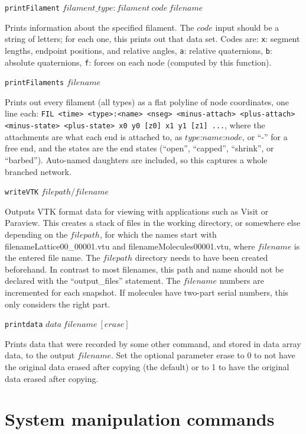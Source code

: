 \documentclass {scrbook}
\newcommand {\ttt} {\texttt}
\begin{document}
\begin{description}
\item{\ttt{printFilament} $filament\_type:filament\ code\ filename$}

Prints information about the specified filament. The $code$ input should be a string of letters; for each one, this prints out that data set. Codes are: \ttt{x}: segment lengths, endpoint positions, and relative angles, \ttt{a}: relative quaternions, \ttt{b}: absolute quaternions, \ttt{f}: forces on each node (computed by this function).

\item{\ttt{printFilaments} $filename$}

Prints out every filament (all types) as a flat polyline of node coordinates, one line each: \ttt{FIL <time> <type>:<name> <nseg> <minus-attach> <plus-attach> <minus-state> <plus-state> x0 y0 [z0] x1 y1 [z1] ...}, where the attachments are what each end is attached to, as $type$:$name$:$node$, or ``-'' for a free end, and the states are the end states (``open'', ``capped'', ``shrink'', or ``barbed''). Auto-named daughters are included, so this captures a whole branched network.

\item{\ttt{writeVTK} $filepath/filename$}

Outputs VTK format data for viewing with applications such as Visit or Paraview. This creates a stack of files in the working directory, or somewhere else depending on the $filepath$, for which the names start with filenameLattice00\_00001.vtu and filenameMolecules00001.vtu, where $filename$ is the entered file name. The $filepath$ directory needs to have been created beforehand. In contrast to most filenames, this path and name should not be declared with the ``output\_files'' statement. The $filename$ numbers are incremented for each snapshot. If molecules have two-part serial numbers, this only considers the right part.

\item{\ttt{printdata} $data\ filename\ [erase]$}

Prints data that were recorded by some other command, and stored in data array data, to the output $filename$. Set the optional parameter erase to 0 to not have the original data erased after copying (the default) or to 1 to have the original data erased after copying.

\end{description}

\section{System manipulation commands}
\end{document}
